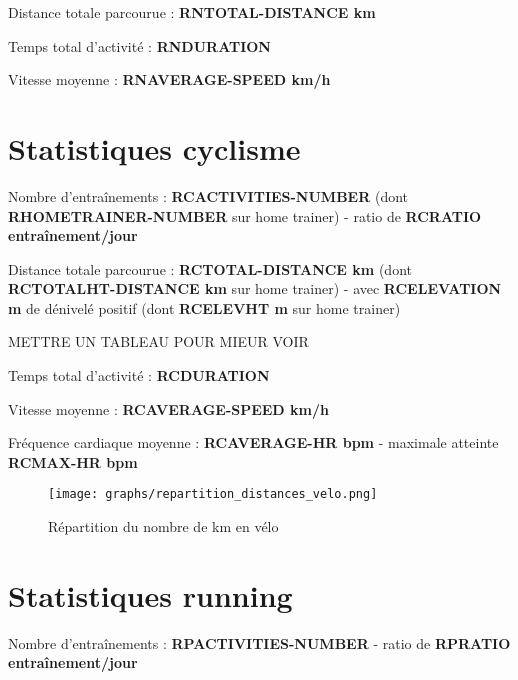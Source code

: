 \documentclass[a4paper,french,11pt]{report}
\begin{document}
\textbullet Distance totale parcourue : \textbf{RNTOTAL-DISTANCE km}

\textbullet Temps total d'activité : \textbf{RNDURATION}

\textbullet Vitesse moyenne : \textbf{RNAVERAGE-SPEED km/h}


\section*{Statistiques cyclisme}
\thispagestyle{empty}


\textbullet Nombre d'entraînements : \textbf{RCACTIVITIES-NUMBER} (dont \textbf{RHOMETRAINER-NUMBER} sur home trainer) -
ratio de \textbf{RCRATIO entraînement/jour}

\textbullet Distance totale parcourue : \textbf{RCTOTAL-DISTANCE km} (dont \textbf{RCTOTALHT-DISTANCE km} sur home trainer) -
avec \textbf{RCELEVATION m} de dénivelé positif (dont \textbf{RCELEVHT m} sur home trainer)

METTRE UN TABLEAU POUR MIEUR VOIR

\textbullet Temps total d'activité : \textbf{RCDURATION}

\textbullet Vitesse moyenne : \textbf{RCAVERAGE-SPEED km/h}

\textbullet Fréquence cardiaque moyenne : \textbf{RCAVERAGE-HR bpm} -
maximale atteinte \textbf{RCMAX-HR bpm}

\begin{figure}[!ht]
\centering
	
\texttt{[image: graphs/repartition\_distances\_velo.png]}
\caption*{Répartition du nombre de km en vélo}
	
\end{figure}


\section*{Statistiques running}
\thispagestyle{empty}


\textbullet Nombre d'entraînements : \textbf{RPACTIVITIES-NUMBER} -
ratio de \textbf{RPRATIO entraînement/jour}
\end{document}
